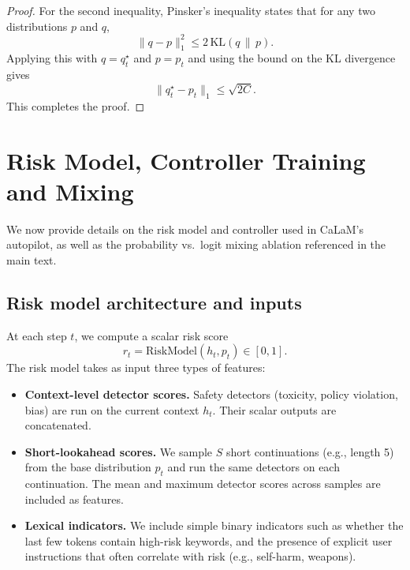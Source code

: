\documentclass{article}
\theoremstyle{plain}
\theoremstyle{definition}
\theoremstyle{remark}
\begin{document}
\begin{proof}
For the second inequality, Pinsker's inequality states that for any two distributions $p$ and $q$,
\begin{equation}
  \|q-p\|_1^2 \le 2\,\mathrm{KL}(q \,\|\, p).
\end{equation}
Applying this with $q=q_t^\star$ and $p=p_t$ and using the bound on the KL divergence gives
\begin{equation}
  \|q_t^\star - p_t\|_1
  \le
  \sqrt{2C}.
\end{equation}
This completes the proof.
\end{proof}

\section{Risk Model, Controller Training and Mixing}
\label{app:controller-training}

We now provide details on the risk model and controller used in CaLaM's autopilot, as well as the probability vs.\ logit mixing ablation referenced in the main text.

\subsection{Risk model architecture and inputs}

At each step $t$, we compute a scalar risk score
\begin{equation}
  r_t = \mathrm{RiskModel}(h_t, p_t) \in [0,1].
\end{equation}
The risk model takes as input three types of features:

\begin{itemize}[leftmargin=1.5em]
  \item \textbf{Context-level detector scores.}
  Safety detectors (toxicity, policy violation, bias) are run on the current context $h_t$.
  Their scalar outputs are concatenated.

  \item \textbf{Short-lookahead scores.}
  We sample $S$ short continuations (e.g., length 5) from the base distribution $p_t$ and run the same detectors on each continuation.
  The mean and maximum detector scores across samples are included as features.

  \item \textbf{Lexical indicators.}
  We include simple binary indicators such as whether the last few tokens contain high-risk keywords, and the presence of explicit user instructions that often correlate with risk (e.g., self-harm, weapons).
\end{itemize}
\end{document}
